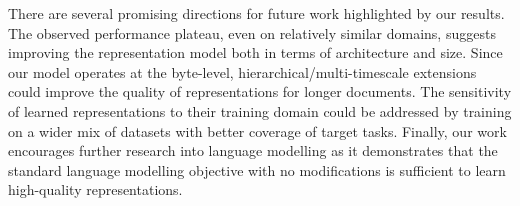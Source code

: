 There are several promising directions for future work highlighted by our results. The observed performance plateau, even on relatively similar domains, suggests improving the representation model both in terms of architecture and size. Since our model operates at the byte-level, hierarchical/multi-timescale extensions could improve the quality of representations for longer documents. The sensitivity of learned representations to their training domain could be addressed by training on a wider mix of datasets with better coverage of target tasks. Finally, our work encourages further research into language modelling as it demonstrates that the standard language modelling objective with no modifications is sufficient to learn high-quality representations.


